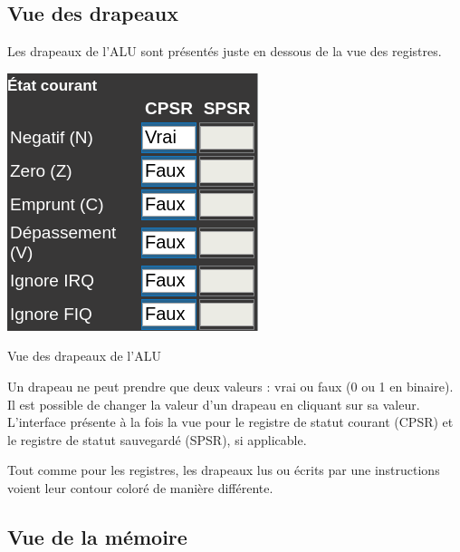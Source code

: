 \documentclass{tufte-handout}
\begin{document}
\subsection{Vue des drapeaux}

Les drapeaux de l'ALU sont présentés juste en dessous de la vue des registres.
\begin{marginfigure}
\includegraphics[width=0.9\linewidth]{pics/drapeaux.png}
\label{f:drapeaux}
\caption{Vue des drapeaux de l'ALU}
\end{marginfigure} 
Un drapeau ne peut prendre que deux valeurs : vrai ou faux (0 ou 1 en binaire). Il est possible de changer la valeur d'un drapeau en cliquant sur sa valeur. L'interface présente à la fois la vue pour le registre de statut courant (CPSR) et le registre de statut sauvegardé (SPSR), si applicable.

Tout comme pour les registres, les drapeaux lus ou écrits par une instructions voient leur contour coloré de manière différente.

\subsection{Vue de la mémoire}
 
\end{document}
